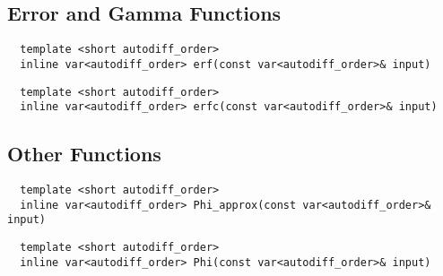 \subsection{Error and Gamma Functions}

\begin{tcolorbox}[colback=white,colframe=gray90, coltitle=black,boxrule=3pt,
fonttitle=\bfseries,title=Error Function]

\begin{verbatim}
  template <short autodiff_order>
  inline var<autodiff_order> erf(const var<autodiff_order>& input)
\end{verbatim}

\end{tcolorbox}

\begin{tcolorbox}[colback=white,colframe=gray90, coltitle=black,boxrule=3pt,
fonttitle=\bfseries,title=Complimentary Error Function]

\begin{verbatim}
  template <short autodiff_order>
  inline var<autodiff_order> erfc(const var<autodiff_order>& input) 
\end{verbatim}

\end{tcolorbox}

\subsection{Other Functions}

\begin{tcolorbox}[colback=white,colframe=gray90, coltitle=black,boxrule=3pt,
fonttitle=\bfseries,title=Fast Approximation to Phi]

\begin{verbatim}
  template <short autodiff_order>
  inline var<autodiff_order> Phi_approx(const var<autodiff_order>& input)
\end{verbatim}

\end{tcolorbox}

\begin{tcolorbox}[colback=white,colframe=gray90, coltitle=black,boxrule=3pt,
fonttitle=\bfseries,title=Phi]

\begin{verbatim}
  template <short autodiff_order>
  inline var<autodiff_order> Phi(const var<autodiff_order>& input)
\end{verbatim}

\end{tcolorbox}
